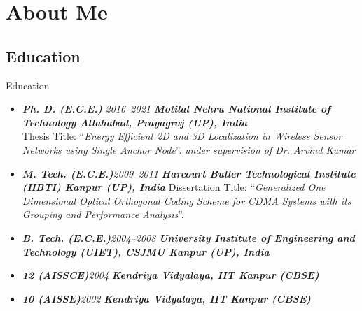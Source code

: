 \documentclass[t,hyperref={pdfpagemode=FullScreen,colorlinks=false},
xcolor={dvipsnames,svgnames,table},9pt]{beamer}
\newcommand{\cusemph}[1]{{\emph{\textbf{#1}}}}
\newcommand{\timeline}[1]{\hfill{\textit{#1}}}
\begin{document}
\section{About Me}
\subsection{Education}
\begin{frame}{Education}{}
\small{
\begin{itemize}
\item {\cusemph{Ph. D. (E.C.E.)}} \timeline{2016--2021} \newline\textbf{\textit{Motilal Nehru National Institute of Technology Allahabad, Prayagraj (UP), India}}\\Thesis Title: ``\emph{Energy Efficient 2D and 3D Localization in Wireless Sensor Networks using Single Anchor Node}''. \timeline{under supervision of Dr. Arvind Kumar}
\item {\cusemph{M. Tech. (E.C.E.)}}\timeline{2009--2011}\newline
\textbf{\textit{Harcourt Butler Technological Institute (HBTI) Kanpur (UP), India}}\newline
Dissertation Title: ``\emph{Generalized One Dimensional Optical Orthogonal Coding Scheme for CDMA Systems with its Grouping and Performance Analysis}''.
\item {\cusemph{B. Tech. (E.C.E.)}}\timeline{2004--2008}\newline
\textbf{\textit{University Institute of Engineering and Technology (UIET), CSJMU Kanpur (UP), India}} 
\item {\cusemph{12 (AISSCE)}}\timeline{2004}\newline
\textbf{\textit{Kendriya Vidyalaya, IIT Kanpur  (CBSE)}}%
\item {\cusemph{10 (AISSE)}}\timeline{2002}\newline
\textbf{\textit{Kendriya Vidyalaya, IIT Kanpur (CBSE)}}%

\end{itemize}
}
\end{frame}


\end{document}
